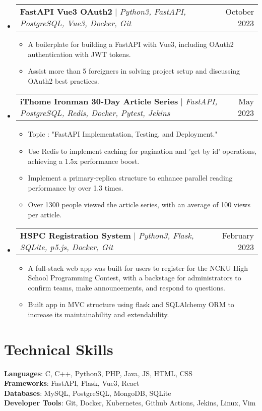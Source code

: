 \documentclass[letterpaper,11pt]{article}
\makeatletter
\newcommand{\resumeItem}[1]{
  \item\small{
    {#1 \vspace{-2pt}}
  }
}
\newcommand{\resumeProjectHeading}[2]{
    \item
    \begin{tabular*}{0.97\textwidth}{l@{\extracolsep{\fill}}r}
      \small#1 & #2 \\
    \end{tabular*}\vspace{-7pt}
}
\newcommand{\resumeSubHeadingListStart}{\begin{itemize}[leftmargin=0.15in, label={}]}
\newcommand{\resumeSubHeadingListEnd}{\end{itemize}}
\newcommand{\resumeItemListStart}{\begin{itemize}}
\newcommand{\resumeItemListEnd}{\end{itemize}\vspace{-5pt}}
\makeatother
\begin{document}
    \resumeSubHeadingListStart
      \resumeProjectHeading
        {\textbf{FastAPI Vue3 OAuth2} $|$ \emph{Python3, FastAPI, PostgreSQL, Vue3, Docker, Git}}{October 2023}
        \resumeItemListStart
          \resumeItem{A boilerplate for building a FastAPI with Vue3, including OAuth2 authentication with JWT tokens.}
          \resumeItem{Assist more than 5 foreigners in solving project setup and discussing OAuth2 best practices.}
        \resumeItemListEnd
      \resumeProjectHeading
          {\textbf{iThome Ironman 30-Day Article Series} $|$ \emph{FastAPI, PostgreSQL, Redis, Docker, Pytest, Jekins}}{May 2023}
          \resumeItemListStart
            \resumeItem{Topic : "FastAPI Implementation, Testing, and Deployment."}
            \resumeItem{Use Redis to implement caching for pagination and 'get by id' operations, achieving a 1.5x performance boost.}
            \resumeItem{Implement a primary-replica structure to enhance parallel reading performance by over 1.3 times.}
            \resumeItem{Over 1300 people viewed the article series, with an average of 100 views per article.}
          \resumeItemListEnd
      \resumeProjectHeading
          {\textbf{HSPC Registration System} $|$ \emph{Python3, Flask, SQLite, p5.js, Docker, Git}}{February 2023}
          \resumeItemListStart
            \resumeItem{A full-stack web app was built for users to register for the NCKU High School Programming Contest, with a backstage for administrators to confirm teams, make announcements, and respond to questions.}
            \resumeItem{Built app in MVC structure using flask and SQLAlchemy ORM to increase its maintainability and extendability.}
          \resumeItemListEnd

    \resumeSubHeadingListEnd


%
\section{Technical Skills}
 \begin{itemize}[leftmargin=0.15in, label={}]
    \small{\item{
     \textbf{Languages}{: C, C++, Python3, PHP, Java, JS, HTML, CSS} \\
     \textbf{Frameworks}{: FastAPI, Flask, Vue3, React} \\
     \textbf{Databases}{: MySQL, PostgreSQL, MongoDB, SQLite } \\
     \textbf{Developer Tools}{: Git, Docker, Kubernetes, Github Actions, Jekins, Linux, Vim}
    }}
 \end{itemize}


\end{document}
